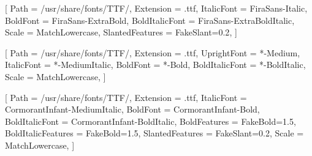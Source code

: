\setsansfont{FiraSans-Regular}[
    Path                    = /usr/share/fonts/TTF/,
    Extension               = .ttf,
    ItalicFont              = FiraSans-Italic,
    BoldFont                = FiraSans-ExtraBold,
    BoldItalicFont          = FiraSans-ExtraBoldItalic,
    Scale                   = MatchLowercase,
    SlantedFeatures         = {FakeSlant=0.2},
]

\setmonofont{JuliaMono}[
    Path            = /usr/share/fonts/TTF/,
    Extension       = .ttf,
    UprightFont     = *-Medium,
    ItalicFont      = *-MediumItalic,
    BoldFont        = *-Bold,
    BoldItalicFont  = *-BoldItalic,
    Scale           = MatchLowercase,
]

\newfontfamily{}[
    Path                    = /usr/share/fonts/TTF/,
    Extension               = .ttf,
    ItalicFont              = CormorantInfant-MediumItalic,
    BoldFont                = CormorantInfant-Bold,
    BoldItalicFont          = CormorantInfant-BoldItalic,
    BoldFeatures            = {FakeBold=1.5},
    BoldItalicFeatures      = {FakeBold=1.5},
    SlantedFeatures         = {FakeSlant=0.2},
    Scale                   = MatchLowercase,
]


